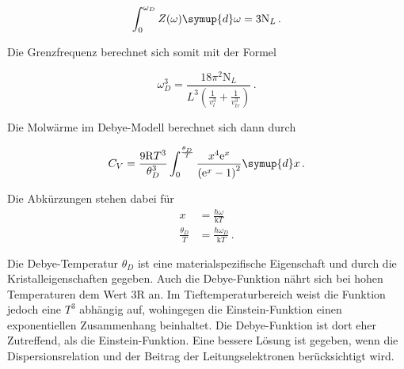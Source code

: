 \begin{equation*}
  \int_0^{\omega_D} Z(\omega) \symup{d} \omega = 3 \text{N}_L \, .
  \label{eqn:int}
\end{equation*}

Die Grenzfrequenz berechnet sich somit mit der Formel

\begin{equation}
  \omega_D^3 = \frac{18 \pi^2 \text{N}_L}{L^3 \left(\frac{1}{v_l^3} + \frac{1}{v_{tr}^3} \right)} \, .
  \label{eqn:omega}
\end{equation}

Die Molwärme im Debye-Modell berechnet sich dann durch

\begin{equation}
  C_V = \frac{9 \text{R} T^3}{\theta_D^3} \int_0^{\frac{\theta_D}{T}}
  \frac{x^4 \mathrm{e}^x} {\left(\mathrm{e}^x -1 \right)^2} \symup{d} x \, .
  \label{eqn:debye}
\end{equation}

Die Abkürzungen stehen dabei für
\begin{align*}
  x &= \frac{\hbar \omega}{\text{k} T} \\
  \frac{\theta_D}{T} &= \frac{\hbar \omega_D}{\text{k} T} \, .
\end{align*}

Die Debye-Temperatur $\theta_D$ ist eine materialspezifische Eigenschaft und
durch die Kristalleigenschaften gegeben. Auch die Debye-Funktion nährt sich
bei hohen Temperaturen dem Wert $3 \text{R}$ an. Im Tieftemperaturbereich
weist die Funktion jedoch eine $T^3$ abhängig auf, wohingegen die
Einstein-Funktion einen exponentiellen Zusammenhang beinhaltet. Die
Debye-Funktion ist dort eher Zutreffend, als die Einstein-Funktion. Eine bessere
Lösung ist gegeben, wenn die Dispersionsrelation und der Beitrag der
Leitungselektronen berücksichtigt wird.
